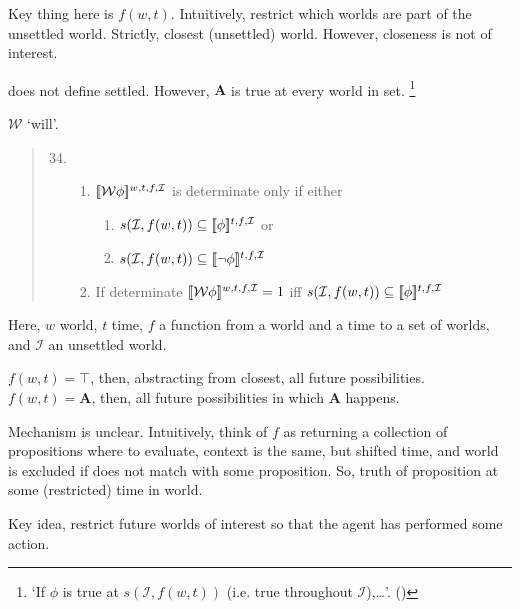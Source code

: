 \begin{note}
  Key thing here is \(f(w,t)\).
  Intuitively, restrict which worlds are part of the unsettled world.
  Strictly, closest (unsettled) world.
  However, closeness is not of interest.

  \citeauthor{Boylan:2020aa} does not define settled.
  However, \(\mathbf{A}\) is true at every world in set.%
  \footnote{
    `If \(\phi\) is true at \(s(\mathcal{I}, f(w,t))\) (i.e. true throughout \(\mathcal{I}\)),\dots'. \mbox{(\citeyear[12]{Boylan:2020aa})}
  }

  \(\mathcal{W}\) `will'.

  \begin{quote}
    \begin{enumerate}
      \setcounter{enumi}{33}
    \item
      \begin{enumerate}
      \item
        \(\sem[w,t,f,\mathcal{I}]{\mathcal{W}\phi}\) is determinate only if either
        \begin{enumerate}
        \item
          \(s(\mathcal{I}, f(w,t)) \subseteq \sem[t,f,\mathcal{I}]{\phi}\) or
        \item
          \(s(\mathcal{I}, f(w,t)) \subseteq \sem[t,f,\mathcal{I}]{\lnot\phi}\)
        \end{enumerate}
      \item
        If determinate \(\sem[w,t,f,\mathcal{I}]{\mathcal{W}\phi} = 1\) iff \(s(\mathcal{I}, f(w,t)) \subseteq \sem[t,f,\mathcal{I}]{\phi}\)
      \end{enumerate}
    \end{enumerate}
  \end{quote}

  Here, \(w\) world, \(t\) time, \(f\) a function from a world and a time to a set of worlds, and \(\mathcal{I}\) an unsettled world.

  \(f(w,t) = \top\), then, abstracting from closest, all future possibilities.
  \(f(w,t) = \mathbf{A}\), then, all future possibilities in which \(\mathbf{A}\) happens.

  Mechanism is unclear.
  Intuitively, think of \(f\) as returning a collection of propositions where to evaluate, context is the same, but shifted time, and world is excluded if does not match with some proposition.
  So, truth of proposition at some (restricted) time in world.

  Key idea, restrict future worlds of interest so that the agent has performed some action.


\end{note}
